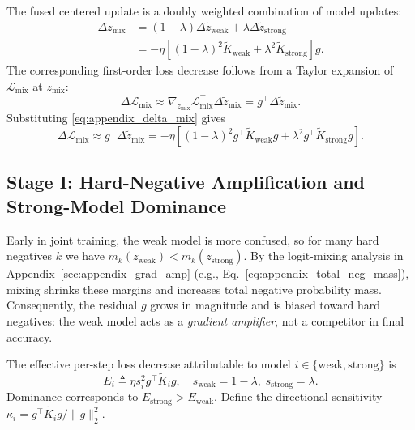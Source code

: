 The fused centered update is a doubly weighted combination of model updates:
\begin{align}
    \Delta \tilde{z}_{\text{mix}}
    &= (1-\lambda)\Delta \tilde{z}_{\mathrm{weak}} + \lambda \Delta \tilde{z}_{\mathrm{strong}} \nonumber\\
    &= -\eta \left[(1-\lambda)^2 \tilde{K}_{\mathrm{weak}} + \lambda^2 \tilde{K}_{\mathrm{strong}}\right] g.
    \label{eq:appendix_delta_mix}
\end{align}
The corresponding first-order loss decrease follows from a Taylor expansion of $\mathcal{L}_{\mathrm{mix}}$ at $z_{\text{mix}}$:
\begin{equation}
    \Delta \mathcal{L}_{\mathrm{mix}} \approx \nabla_{z_{\text{mix}}}\mathcal{L}_{\mathrm{mix}}^\top \Delta \tilde{z}_{\text{mix}}
    = g^\top \Delta \tilde{z}_{\text{mix}}.
    \label{eq:appendix_taylor_loss}
\end{equation}
Substituting \eqref{eq:appendix_delta_mix} gives
\begin{equation}
    \Delta \mathcal{L}_{\mathrm{mix}} \approx g^\top \Delta \tilde{z}_{\text{mix}}
    = -\eta \left[(1-\lambda)^2 g^\top \tilde{K}_{\mathrm{weak}} g + \lambda^2 g^\top \tilde{K}_{\mathrm{strong}} g\right].
    \label{eq:appendix_delta_loss}
\end{equation}

\subsection{Stage I: Hard-Negative Amplification and Strong-Model Dominance}
Early in joint training, the weak model is more confused, so for many hard negatives $k$ we have $m_k(z_{\mathrm{weak}}) < m_k(z_{\mathrm{strong}})$. By the logit-mixing analysis in Appendix~\ref{sec:appendix_grad_amp} (e.g., Eq.~\eqref{eq:appendix_total_neg_mass}), mixing shrinks these margins and increases total negative probability mass. Consequently, the residual $g$ grows in magnitude and is biased toward hard negatives: the weak model acts as a \emph{gradient amplifier}, not a competitor in final accuracy.

The effective per-step loss decrease attributable to model $i \in \{\mathrm{weak}, \mathrm{strong}\}$ is
\begin{equation}
    E_i \triangleq \eta s_i^2 g^\top \tilde{K}_i g, \quad s_{\mathrm{weak}} = 1-\lambda,\; s_{\mathrm{strong}} = \lambda.
\end{equation}
Dominance corresponds to $E_{\mathrm{strong}} > E_{\mathrm{weak}}$. Define the directional sensitivity $\kappa_i = g^\top \tilde{K}_i g / \|g\|_2^2$.

